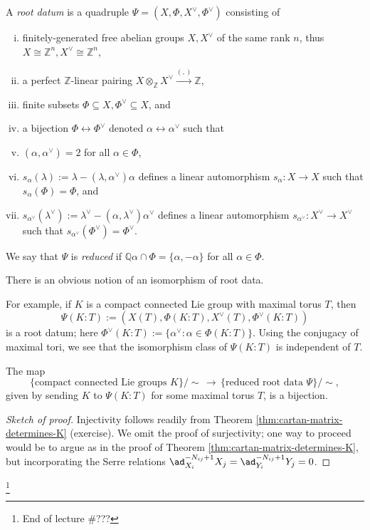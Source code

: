 \documentclass[reqno]{amsart} 
\begin{document}
\begin{definition}
  A \emph{root datum} is a quadruple $\Psi = (X, \Phi, X^\vee, \Phi^\vee)$ consisting of
  \begin{enumerate}
[(i)]
  \item finitely-generated free abelian groups $X, X^\vee$ of the same rank $n$, thus $X \cong \mathbb{Z}^n, X^\vee \cong \mathbb{Z}^n$,
  \item a perfect $\mathbb{Z}$-linear pairing $X \otimes_{\mathbb{Z}} X^\vee \xrightarrow{(,)} \mathbb{Z}$,
  \item finite subsets $\Phi \subseteq X, \Phi^\vee \subseteq X$, and
  \item a bijection $\Phi \leftrightarrow \Phi^\vee$ denoted $\alpha \leftrightarrow \alpha^\vee$ such that
  \item $(\alpha,\alpha^\vee) = 2$ for all $\alpha \in \Phi$,
  \item $s_\alpha(\lambda) := \lambda - (\lambda,\alpha^\vee) \alpha$ defines a linear automorphism $s_\alpha : X \rightarrow X$ such that $s_\alpha(\Phi) = \Phi$, and
  \item $s_{\alpha^\vee}(\lambda^\vee) := \lambda^\vee - (\alpha,\lambda^\vee) \alpha^\vee$ defines a linear automorphism $s_{\alpha^\vee} : X^\vee \rightarrow X^\vee$ such that $s_{\alpha^\vee}(\Phi^\vee) = \Phi^\vee$.
  \end{enumerate}
  We say that $\Psi$ is \emph{reduced} if $\mathbb{Q} \alpha \cap \Phi = \{\alpha, - \alpha \}$ for all $\alpha \in \Phi$.

  There is an obvious notion of an isomorphism of root data.
\end{definition}

For example, if $K$ is a compact connected Lie group with maximal torus $T$, then
\begin{equation*}
  \Psi(K:T) :=(X(T), \Phi(K:T),X^\vee(T), \Phi^\vee(K:T))
\end{equation*}
is a root datum; here $\Phi^\vee(K:T) := \{\alpha^\vee : \alpha \in \Phi(K:T)\}$.  Using the conjugacy of maximal tori, we see that the isomorphism class of $\Psi(K:T)$ is independent of $T$.
\begin{theorem}
  The map
  \begin{equation*}
    \{\text{compact connected Lie groups } K\}/\sim \, \longrightarrow \, \{\text{reduced root data } \Psi \} / \sim,
  \end{equation*}
  given by sending $K$ to $\Psi(K:T)$ for some maximal torus $T$, is a bijection.
\end{theorem}
\begin{proof}
[Sketch of proof]
  Injectivity follows readily from Theorem \ref{thm:cartan-matrix-determines-K} (exercise).  We omit the proof of surjectivity; one way to proceed would be to argue as in the proof of Theorem \ref{thm:cartan-matrix-determines-K}, but incorporating the Serre relations $\ad_{X_i}^{-N_{i j}+1} X_j = \ad_{Y_i}^{-N_{ij}+1} Y_j = 0$.
\end{proof}
\footnote{End of lecture \#???}
\end{document}
